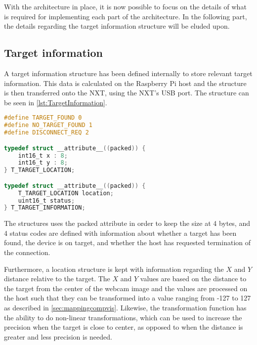 With the architecture in place, it is now possible to focus on the details of what is required for implementing each part of the architecture.
In the following part, the details regarding the target information structure will be eluded upon.

\subsection{Target information}
A target information structure has been defined internally to store relevant target information.
This data is calculated on the Raspberry Pi host and the structure is then transferred onto the NXT, using the NXT's USB port.
The structure can be seen in \autoref{lst:TargetInformation}.
\begin{lstlisting}[language=C, label={lst:TargetInformation},caption={Target information structure from target\_location.h}]
#define TARGET_FOUND 0
#define NO_TARGET_FOUND 1
#define DISCONNECT_REQ 2

typedef struct __attribute__((packed)) {
	int16_t x : 8;
	int16_t y : 8;
} T_TARGET_LOCATION;

typedef struct __attribute__((packed)) {
	T_TARGET_LOCATION location;
	uint16_t status;
} T_TARGET_INFORMATION;
\end{lstlisting}

The structures uses the packed attribute in order to keep the size at 4 bytes, and 4 status codes are defined with information about whether a target has been found, the device is on target, and whether the host has requested termination of the connection.

Furthermore, a location structure is kept with information regarding the $X$ and $Y$ distance relative to the target.
The $X$ and $Y$ values are based on the distance to the target from the center of the webcam image and the values are processed on the host such that they can be transformed into a value ranging from -127 to 127 as described in \autoref{sec:mappingcompvis}.
Likewise, the transformation function has the ability to do non-linear transformations, which can be used to increase the precision when the target is close to center, as opposed to when the distance is greater and less precision is needed.
